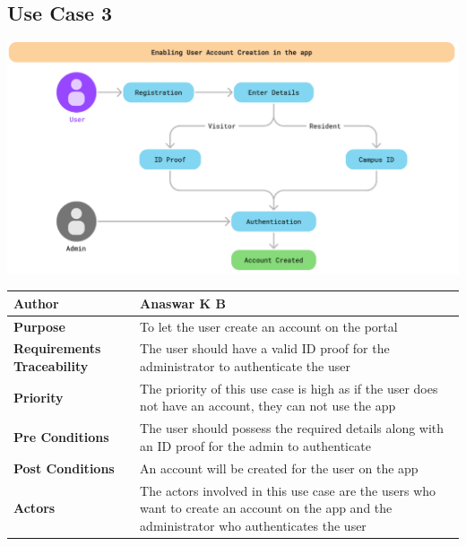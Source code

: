 \documentclass{scrreprt}
\begin{document}
\subsection{Use Case 3}
\begin{center}
\includegraphics*[scale=0.6]{usecase-3.png}\\
\vspace{5mm}
\begin{tabular}{|l|p{10cm}|}
    \hline
    \textbf{Author} & Anaswar K B \\
    \hline
    \textbf{Purpose} &  To let the user create an account on the portal\\
    \hline
    \textbf{Requirements Traceability} & The user should have a valid ID proof for the administrator to authenticate the user\\
    \hline
    \textbf{Priority} & The priority of this use case is high as if the user does not have an account, they can not use the app\\
    \hline
    \textbf{Pre Conditions} &The user should possess the required details along with an ID proof for the admin to authenticate \\
    \hline
    \textbf{Post Conditions} & An account will be created for the user on the app\\
    \hline
    \textbf{Actors} & The actors involved in this use case are the users who want to create an account on the app and the administrator who authenticates the user\\
    \hline
\end{tabular}
\end{center}
\end{document}

